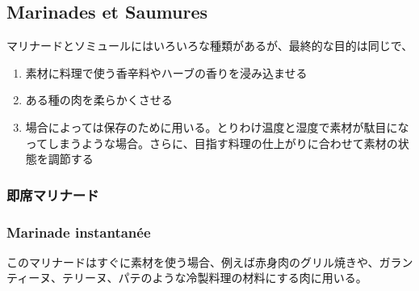 \hypertarget{marinades-et-saumucres}{%
\subsection{Marinades et Saumures}\label{marinades-et-saumucres}}

 

マリナードとソミュールにはいろいろな種類があるが、最終的な目的は同じで、

\begin{enumerate}
\def\labelenumi{\arabic{enumi}.}
\item
  素材に料理で使う香辛料やハーブの香りを浸み込ませる
\item
  ある種の肉を柔らかくさせる
\item
  場合によっては保存のために用いる。とりわけ温度と湿度で素材が駄目になってしまうような場合。さらに、目指す料理の仕上がりに合わせて素材の状態を調節する
\end{enumerate}
\begin{recette}
\hypertarget{ux5373ux5e2dux30deux30eaux30caux30fcux30c9}{%
\subsubsection{即席マリナード}\label{ux5373ux5e2dux30deux30eaux30caux30fcux30c9}}

\hypertarget{marinade-instantanuxe9e}{%
\subsubsection{Marinade instantanée}\label{marinade-instantanuxe9e}}

このマリナードはすぐに素材を使う場合、例えば赤身肉のグリル焼きや、ガランティーヌ、テリーヌ、パテのような冷製料理の材料にする肉に用いる。
\end{recette}